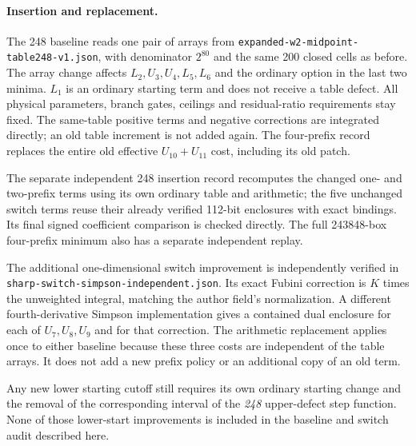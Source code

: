 \paragraph{Insertion and replacement.}
The 248 baseline reads one pair of arrays from
\texttt{expanded-w2-midpoint-table248-v1.json}, with denominator $2^{80}$
and the same 200 closed cells as before.  The array change affects
$L_2,U_3,U_4,L_5,L_6$ and the ordinary option in the last two minima.
$L_1$ is an ordinary starting term and does not receive a table defect.
All physical parameters, branch gates, ceilings and residual-ratio
requirements stay fixed.  The same-table positive terms and negative
corrections are integrated directly; an old table increment is not
added again.  The four-prefix record replaces the entire old effective
$U_{10}+U_{11}$ cost, including its old patch.

The separate independent 248 insertion record recomputes the changed
one- and two-prefix terms using its own ordinary table and arithmetic;
the five unchanged switch terms reuse their already verified 112-bit
enclosures with exact bindings.  Its final signed coefficient comparison
is checked directly.  The full 243848-box four-prefix minimum also has
a separate independent replay.

The additional one-dimensional switch improvement is independently
verified in \texttt{sharp-switch-simpson-independent.json}.  Its exact
Fubini correction is $K$ times the unweighted integral, matching the
author field's normalization.  A different fourth-derivative Simpson
implementation gives a contained dual enclosure for each of $U_7,U_8,U_9$
and for that correction.  The arithmetic replacement applies once to
either baseline because these three costs are independent of the table
arrays.  It does not add a new prefix policy or an additional copy of
an old term.

Any new lower starting cutoff still requires its own ordinary starting
change and the removal of the corresponding interval of the \emph{248}
upper-defect step function.  None of those lower-start improvements is
included in the baseline and switch audit described here.
